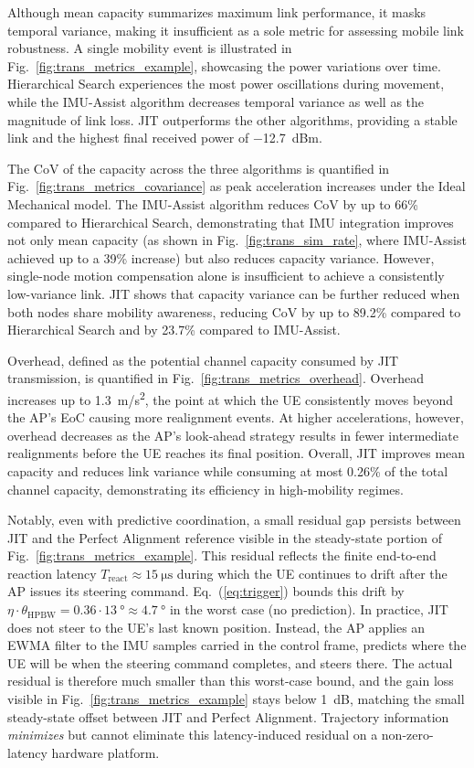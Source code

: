 \documentclass[fleqn,10pt]{wlscirep}
\newcommand{\rev}[1]{{\color{revblue}#1}}
\begin{document}
Although mean capacity summarizes maximum link performance, it masks temporal variance, making it insufficient as a sole metric for assessing mobile link robustness. A single mobility event is illustrated in Fig.~\ref{fig:trans_metrics_example}, showcasing the power variations over time. Hierarchical Search experiences the most power oscillations during movement, while the IMU-Assist algorithm decreases temporal variance as well as the magnitude of link loss. JIT outperforms the other algorithms, providing a stable link and the highest final received power of \SI{-12.7}{dBm}.

The CoV of the capacity across the three algorithms is quantified in Fig.~\ref{fig:trans_metrics_covariance} as peak acceleration increases under the Ideal Mechanical model. The IMU-Assist algorithm reduces CoV by up to 66\% compared to Hierarchical Search, demonstrating that IMU integration improves not only mean capacity (as shown in Fig.~\ref{fig:trans_sim_rate}, where IMU-Assist achieved up to a 39\% increase) but also reduces capacity variance. However, single-node motion compensation alone is insufficient to achieve a consistently low-variance link. JIT shows that capacity variance can be further reduced when both nodes share mobility awareness, reducing CoV by up to 89.2\% compared to Hierarchical Search and by 23.7\% compared to IMU-Assist.

Overhead, defined as the potential channel capacity consumed by JIT transmission, is quantified in Fig.~\ref{fig:trans_metrics_overhead}. Overhead increases up to \SI{1.3}{m/s^2}, the point at which the UE consistently moves beyond the AP's EoC causing more realignment events. At higher accelerations, however, overhead decreases as the AP's look-ahead strategy results in fewer intermediate realignments before the UE reaches its final position. Overall, JIT improves mean capacity and reduces link variance while consuming at most 0.26\% of the total channel capacity, demonstrating its efficiency in high-mobility regimes.

\rev{Notably, even with predictive coordination, a small residual gap persists between JIT and the Perfect Alignment reference visible in the steady-state portion of Fig.~\ref{fig:trans_metrics_example}. This residual reflects the finite end-to-end reaction latency $T_{\text{react}} \approx \SI{15}{\micro\second}$ during which the UE continues to drift after the AP issues its steering command. Eq.~(\ref{eq:trigger}) bounds this drift by $\eta \cdot \theta_{\text{HPBW}} = 0.36 \cdot \SI{13}{\degree} \approx \SI{4.7}{\degree}$ in the worst case (no prediction). In practice, JIT does not steer to the UE's last known position. Instead, the AP applies an EWMA filter to the IMU samples carried in the control frame, predicts where the UE will be when the steering command completes, and steers there. The actual residual is therefore much smaller than this worst-case bound, and the gain loss visible in Fig.~\ref{fig:trans_metrics_example} stays below \SI{1}{\deci\bel}, matching the small steady-state offset between JIT and Perfect Alignment. Trajectory information \emph{minimizes} but cannot eliminate this latency-induced residual on a non-zero-latency hardware platform.}
\end{document}
